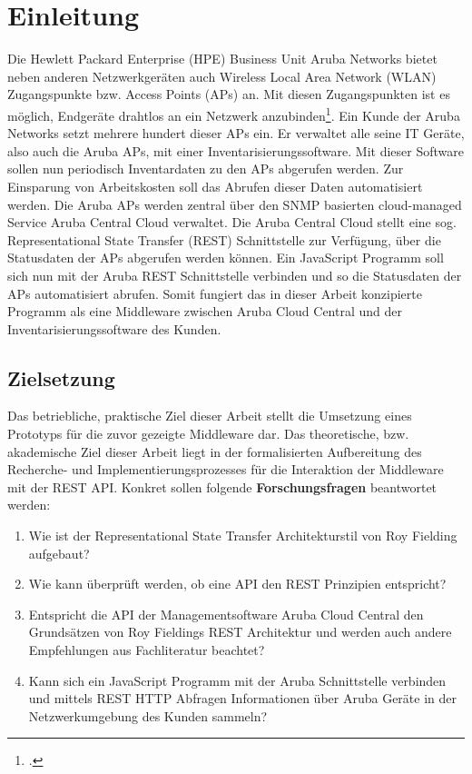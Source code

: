 \chapter{Einleitung}\label{chapter:einleitung}

Die Hewlett Packard Enterprise (HPE) Business Unit Aruba Networks bietet neben anderen Netzwerkgeräten auch Wireless Local Area Network (WLAN) Zugangspunkte bzw. Access Points (APs) an. Mit diesen Zugangspunkten ist es möglich, Endgeräte drahtlos an ein Netzwerk anzubinden\footcite[Vgl. ][]{hewlett_packard_enterprise_development_lp_access_2021}. Ein Kunde der Aruba Networks setzt mehrere hundert dieser APs ein. Er verwaltet alle seine IT Geräte, also auch die Aruba APs, mit einer Inventarisierungssoftware. Mit dieser Software sollen nun periodisch Inventardaten zu den APs abgerufen werden. Zur Einsparung von Arbeitskosten soll das Abrufen dieser Daten automatisiert werden. Die Aruba APs werden zentral über den SNMP basierten cloud-managed Service Aruba Central Cloud verwaltet. Die Aruba Central Cloud stellt eine sog. Representational State Transfer (REST) Schnittstelle zur Verfügung, über die Statusdaten der APs abgerufen werden können. Ein JavaScript Programm soll sich nun mit der Aruba REST Schnittstelle verbinden und so die Statusdaten der APs automatisiert abrufen. Somit fungiert das in dieser Arbeit konzipierte Programm als eine Middleware zwischen Aruba Cloud Central und der Inventarisierungssoftware des Kunden. 

\section{Zielsetzung}\label{section:zielsetzung}

Das betriebliche, praktische Ziel dieser Arbeit stellt die Umsetzung eines Prototyps für die zuvor gezeigte Middleware dar. Das theoretische, bzw. akademische Ziel dieser Arbeit liegt in der formalisierten Aufbereitung des Recherche- und Implementierungsprozesses für die Interaktion der Middleware mit der REST API. Konkret sollen folgende \textbf{Forschungsfragen} beantwortet werden:

\begin{enumerate}
    \item Wie ist der Representational State Transfer Architekturstil von Roy Fielding aufgebaut?
    \item Wie kann überprüft werden, ob eine API den REST Prinzipien entspricht?
    \item Entspricht die API der Managementsoftware Aruba Cloud Central den Grundsätzen von Roy Fieldings REST Architektur und werden auch andere Empfehlungen aus Fachliteratur beachtet?
    \item Kann sich ein JavaScript Programm mit der Aruba Schnittstelle verbinden und mittels REST HTTP Abfragen Informationen über Aruba Geräte in der Netzwerkumgebung des Kunden sammeln?
\end{enumerate}

